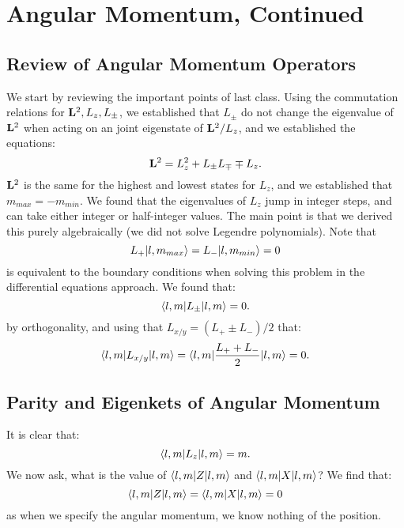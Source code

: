 \section{Angular Momentum, Continued}
\subsection{Review of Angular Momentum Operators}
We start by reviewing the important points of last class. Using the commutation relations for $\mathbf{L}^2, L_z, L_\pm$, we established that $L_\pm$ do not change the eigenvalue of $\mathbf{L}^2$ when acting on an joint eigenstate of $\mathbf{L}^2/L_z$, and we established the equations:
\begin{equation}
    \mathbf{L}^2 = L_z^2 + L_{\pm}L_{\mp} \mp L_z.
\end{equation}
$\mathbf{L}^2$ is the same for the highest and lowest states for $L_z$, and we established that $m_{max} = -m_{min}$. We found that the eigenvalues of $L_z$ jump in integer steps, and can take either integer or half-integer values. The main point is that we derived this purely algebraically (we did not solve Legendre polynomials). Note that 
\begin{equation}
    L_+\lvert l, m_{max} \rangle = L_-\lvert l, m_{min} \rangle = 0
\end{equation}
is equivalent to the boundary conditions when solving this problem in the differential equations approach. We found that:
\begin{equation}
    \langle l, m \rvert L_{\pm} \lvert l, m \rangle = 0.
\end{equation}
by orthogonality, and using that $L_{x/y} = (L_+ \pm L_-)/2$ that:
\begin{equation}
    \langle l, m \rvert L_{x/y}\lvert l, m \rangle = \langle l, m \rvert\frac{L_+ + L_-}{2}\lvert l, m \rangle = 0.
\end{equation}


\subsection{Parity and Eigenkets of Angular Momentum}
It is clear that:
\begin{equation}
    \langle l, m \rvert L_z\lvert l, m \rangle = m.
\end{equation}
We now ask, what is the value of $\langle l, m \rvert Z\lvert l, m \rangle$ and $\langle l, m \rvert X\lvert l, m \rangle$? We find that:
\begin{equation}
    \langle l, m \rvert Z\lvert l, m \rangle = \langle l, m \rvert X\lvert l, m \rangle = 0
\end{equation}
as when we specify the angular momentum, we know nothing of the position.


